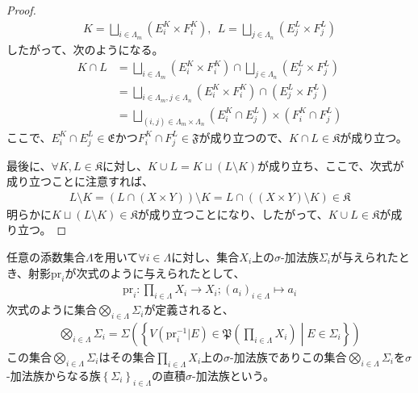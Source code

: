 \documentclass[dvipdfmx]{jsarticle}
\begin{document}
\begin{proof}
\begin{align*}
K = \bigsqcup_{i \in \varLambda_{m}} \left( E_{i}^{K} \times F_{i}^{K} \right),\ \ L = \bigsqcup_{j \in \varLambda_{n}} \left( E_{j}^{L} \times F_{j}^{L} \right)
\end{align*}
したがって、次のようになる。
\begin{align*}
K \cap L &= \bigsqcup_{i \in \varLambda_{m}} \left( E_{i}^{K} \times F_{i}^{K} \right) \cap \bigsqcup_{j \in \varLambda_{n}} \left( E_{j}^{L} \times F_{j}^{L} \right)\\
&= \bigsqcup_{i \in \varLambda_{m},j \in \varLambda_{n}} {\left( E_{i}^{K} \times F_{i}^{K} \right) \cap \left( E_{j}^{L} \times F_{j}^{L} \right)}\\
&= \bigsqcup_{(i,j) \in \varLambda_{m} \times \varLambda_{n}} {\left( E_{i}^{K} \cap E_{j}^{L} \right) \times \left( F_{i}^{K} \cap F_{j}^{L} \right)}
\end{align*}
ここで、$E_{i}^{K} \cap E_{j}^{L}\in \mathfrak{E}$かつ$F_{i}^{K} \cap F_{j}^{L}\in \mathfrak{F}$が成り立つので、$K \cap L \in \mathfrak{K}$が成り立つ。\par
最後に、$\forall K,L \in \mathfrak{K}$に対し、$K \cup L = K \sqcup (L \setminus K)$が成り立ち、ここで、次式が成り立つことに注意すれば、
\begin{align*}
L \setminus K = \left( L \cap (X \times Y) \right) \setminus K = L \cap \left( (X \times Y) \setminus K \right) \in \mathfrak{K}
\end{align*}
明らかに$K \sqcup (L \setminus K) \in \mathfrak{K}$が成り立つことになり、したがって、$K \cup L \in \mathfrak{K}$が成り立つ。
\end{proof}
\begin{dfn*}
任意の添数集合$\varLambda$を用いて$\forall i \in \varLambda$に対し、集合$X_{i}$上の$\sigma$-加法族$\varSigma_{i}$が与えられたとき、射影$\mathrm{pr}_{i}$が次式のように与えられたとして、
\begin{align*}
\mathrm{pr}_{i}:\prod_{i \in \varLambda} X_{i} \rightarrow X_{i};\left( a_{i} \right)_{i \in \varLambda} \mapsto a_{i}
\end{align*}
次式のように集合$\bigotimes_{i \in \varLambda} \varSigma_{i}$が定義されると、
\begin{align*}
\bigotimes_{i \in \varLambda} \varSigma_{i} = \varSigma\left( \left\{ V\left( \mathrm{pr}_{i}^{- 1}|E \right)\in \mathfrak{P}\left( \prod_{i \in \varLambda} X_{i} \right) \middle| E \in \varSigma_{i} \right\} \right)
\end{align*}
この集合$\bigotimes_{i \in \varLambda} \varSigma_{i}$はその集合$\prod_{i \in \varLambda} X_{i}$上の$\sigma$-加法族でありこの集合$\bigotimes_{i \in \varLambda} \varSigma_{i}$を$\sigma$-加法族からなる族$\left\{ \varSigma_{i} \right\}_{i \in \varLambda}$の直積$\sigma$-加法族という。
\end{dfn*}\par
\end{document}

